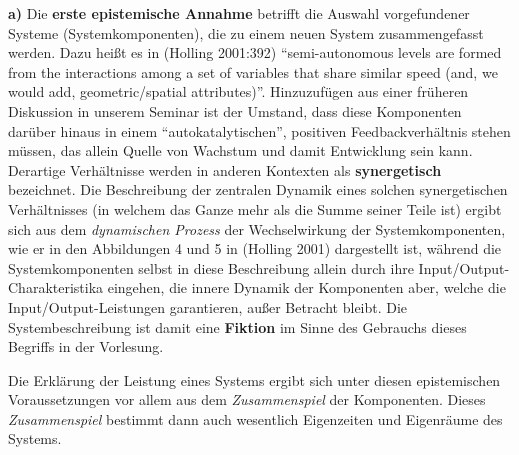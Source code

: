 \documentclass[11pt,a4paper]{article}
\begin{document}
\textbf{a)} Die \textbf{erste epistemische Annahme} betrifft die Auswahl
vorgefundener Systeme (Systemkomponenten), die zu einem neuen System
zusammengefasst werden. Dazu heißt es in (Holling 2001:392)
``semi-autonomous levels are formed from the interactions among a set of
variables that share similar speed (and, we would add, geometric/spatial
attributes)''. Hinzuzufügen aus einer früheren Diskussion in unserem
Seminar ist der Umstand, dass diese Komponenten darüber hinaus in einem
``autokatalytischen'', positiven Feedbackverhältnis stehen müssen, das
allein Quelle von Wachstum und damit Entwicklung sein kann. Derartige
Verhältnisse werden in anderen Kontexten als \textbf{synergetisch}
bezeichnet. Die Beschreibung der zentralen Dynamik eines solchen
synergetischen Verhältnisses (in welchem das Ganze mehr als die Summe
seiner Teile ist) ergibt sich aus dem \emph{dynamischen Prozess} der
Wechselwirkung der Systemkomponenten, wie er in den Abbildungen 4 und 5
in (Holling 2001) dargestellt ist, während die Systemkomponenten selbst
in diese Beschreibung allein durch ihre Input/Output-Charakteristika
eingehen, die innere Dynamik der Komponenten aber, welche die
Input/Output-Leistungen garantieren, außer Betracht bleibt. Die
Systembeschreibung ist damit eine \textbf{Fiktion} im Sinne des
Gebrauchs dieses Begriffs in der Vorlesung.

Die Erklärung der Leistung eines Systems ergibt sich unter diesen
epistemischen Voraussetzungen vor allem aus dem \emph{Zusammenspiel} der
Komponenten. Dieses \emph{Zusammenspiel} bestimmt dann auch wesentlich
Eigenzeiten und Eigenräume des Systems.
\end{document}
